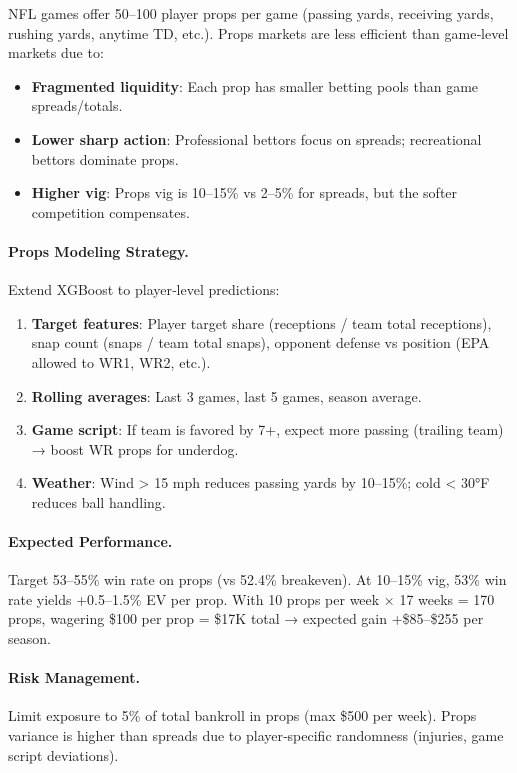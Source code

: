 NFL games offer 50--100 player props per game (passing yards, receiving yards, rushing yards, anytime TD, etc.). Props markets are less efficient than game‑level markets due to:
\begin{itemize}
\item \textbf{Fragmented liquidity}: Each prop has smaller betting pools than game spreads/totals.
\item \textbf{Lower sharp action}: Professional bettors focus on spreads; recreational bettors dominate props.
\item \textbf{Higher vig}: Props vig is 10--15\% vs 2--5\% for spreads, but the softer competition compensates.
\end{itemize}

\paragraph{Props Modeling Strategy.}
Extend XGBoost to player‑level predictions:
\begin{enumerate}
\item \textbf{Target features}: Player target share (receptions / team total receptions), snap count (snaps / team total snaps), opponent defense vs position (EPA allowed to WR1, WR2, etc.).
\item \textbf{Rolling averages}: Last 3 games, last 5 games, season average.
\item \textbf{Game script}: If team is favored by 7+, expect more passing (trailing team) → boost WR props for underdog.
\item \textbf{Weather}: Wind > 15 mph reduces passing yards by 10--15\%; cold < 30°F reduces ball handling.
\end{enumerate}

\paragraph{Expected Performance.}
Target 53--55\% win rate on props (vs 52.4\% breakeven). At 10--15\% vig, 53\% win rate yields +0.5--1.5\% EV per prop. With 10 props per week × 17 weeks = 170 props, wagering \$100 per prop = \$17K total → expected gain +\$85--\$255 per season.

\paragraph{Risk Management.}
Limit exposure to 5\% of total bankroll in props (max \$500 per week). Props variance is higher than spreads due to player‑specific randomness (injuries, game script deviations).

